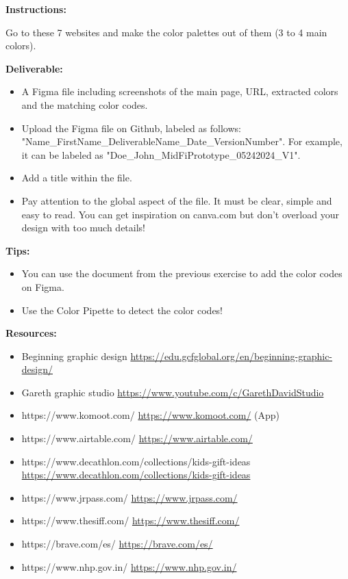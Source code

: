 \makeheaderfiles

\textbf{Instructions:}

Go to these 7 websites and make the color palettes out of them (3 to 4 main colors).

\textbf{Deliverable:}

\begin{itemize}
\item A Figma file including screenshots of the main page, URL, extracted colors and the matching color codes.
\item Upload the Figma file on Github, labeled as follows: "Name\_FirstName\_DeliverableName\_Date\_VersionNumber". For example, it can be labeled as "Doe\_John\_MidFiPrototype\_05242024\_V1".
\item Add a title within the file.
\item Pay attention to the global aspect of the file. It must be clear, simple and easy to read. You can get inspiration on canva.com but don't overload your design with too much details!
\end{itemize}

\textbf{Tips:}

\begin{itemize}
\item You can use the document from the previous exercise to add the color codes on Figma.
\item Use the Color Pipette to detect the color codes!
\end{itemize}

\textbf{Resources:}

\begin{itemize}
\item Beginning graphic design \url{https://edu.gcfglobal.org/en/beginning-graphic-design/}
\item Gareth graphic studio \url{https://www.youtube.com/c/GarethDavidStudio}
\end{itemize}

\begin{itemize}
\item https://www.komoot.com/ \url{https://www.komoot.com/} (App)
\item https://www.airtable.com/ \url{https://www.airtable.com/}
\item https://www.decathlon.com/collections/kids-gift-ideas \url{https://www.decathlon.com/collections/kids-gift-ideas}
\item https://www.jrpass.com/ \url{https://www.jrpass.com/}
\item https://www.thesiff.com/ \url{https://www.thesiff.com/}
\item https://brave.com/es/ \url{https://brave.com/es/}
\item https://www.nhp.gov.in/ \url{https://www.nhp.gov.in/}
\end{itemize}

